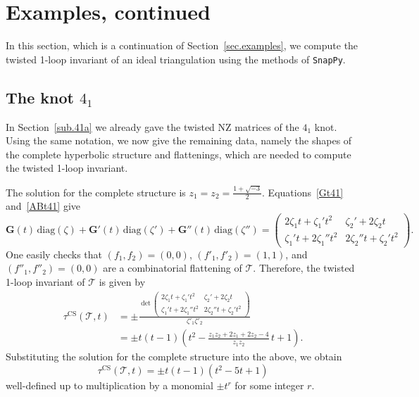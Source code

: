 \documentclass[12pt,reqno]{amsart}
\theoremstyle{definition}
\def\calT{\mathcal T}
\def\be{\begin{equation}}
\def\ee{\end{equation}}
\def\CS{\mathrm{CS}}
\def\diag{\mathrm{diag}}
\begin{document}

\section{Examples, continued}
\label{sec.examplesb}

In this section, which is a continuation of Section~\ref{sec.examples},
we compute the twisted 1-loop invariant of an ideal triangulation
using the methods of \texttt{SnapPy}.

\subsection{The  knot $4_1$}
\label{sub.41}


In Section~\ref{sub.41a} we already gave the twisted NZ matrices of
the $4_1$ knot. Using the same notation, we now give the remaining data, namely
the shapes of the complete hyperbolic structure and flattenings, which are needed
to compute the twisted 1-loop invariant.

The solution for the complete structure is $z_1=z_2=\frac{1+\sqrt{-3}}{2}$.
Equations~\eqref{Gt41} and~\eqref{ABt41} give
\be
\mathbf{G}(t)\, \diag(\zeta) + 
\mathbf{G}'(t)\, \diag(\zeta') + 
\mathbf{G}''(t)\, \diag(\zeta'') = 
\begin{pmatrix}
2\zeta_1 t + \zeta_1' t^2 & \zeta_2' + 2 \zeta_2 t\\
\zeta_1' t+ 2 \zeta_1'' t^2 & 2 \zeta_2'' t + \zeta_2' t^2
\end{pmatrix}  .
\ee
One easily checks that $(f_1,f_2)=(0,0)$, $(f'_1,f'_2)=(1,1)$, and
$(f''_1,f''_2)=(0,0)$ are a combinatorial flattening of $\calT$.
Therefore, the twisted 1-loop invariant of $\calT$ is given by
\begin{align}
\tau^{\CS}(\calT,t)&= \pm \frac{\det
\begin{pmatrix}
2\zeta_1 t + \zeta_1' t^2 & \zeta_2' + 2 \zeta_2 t\\
\zeta_1' t+ 2 \zeta_1'' t^2 & 2 \zeta_2'' t + \zeta_2' t^2
\end{pmatrix}
}{\zeta'_1 \zeta'_2}\\
&= \pm t(t-1) \left(t^2- \frac{z_1 z_2+2z_1 +2z_2-4}{z_1z_2}\, t +1\right)  .
\end{align}
Substituting the solution for the complete structure into the above, we obtain
\[
  \tau^{\CS}(\calT,t)=\pm t(t-1)(t^2-5t+1)
\]
well-defined up to multiplication by a monomial $\pm t^r$ for some integer $r$.
\end{document}
